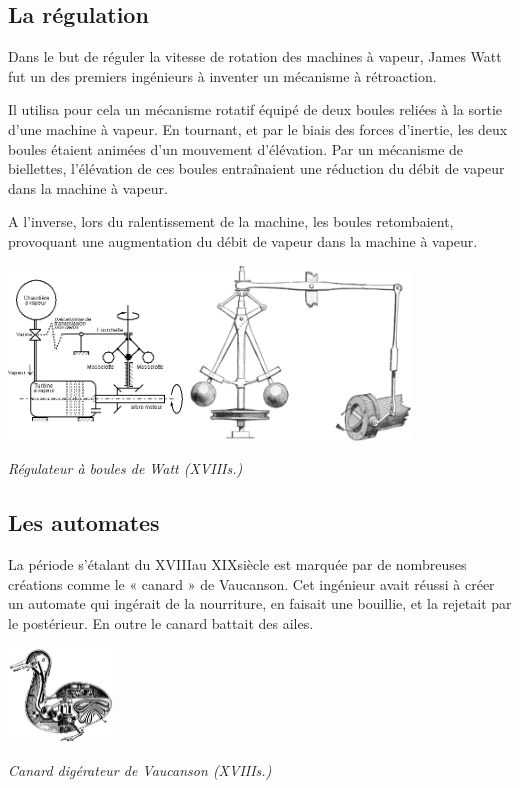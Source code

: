 \documentclass[11pt,oneside]{article}
\begin{document}
\subsection{La régulation}

Dans le but de réguler la vitesse de rotation des machines à vapeur, James Watt
fut un des premiers ingénieurs à inventer un mécanisme à rétroaction. 

Il utilisa pour cela un mécanisme rotatif équipé de deux boules reliées à la
sortie d'une machine à vapeur. En tournant, et par le biais des forces
d'inertie, les deux boules étaient animées d'un mouvement d'élévation. Par un
mécanisme de biellettes, l'élévation de ces boules entraînaient une réduction
du débit de vapeur dans la machine à vapeur. 

A l'inverse, lors du ralentissement de la machine, les boules retombaient,
provoquant une augmentation du débit de vapeur dans la machine à vapeur.

\begin{center}
 \includegraphics[width=0.8\textwidth]{png/watt}

\textit{Régulateur à boules de Watt (XVIII\ieme s.)}
 \end{center}


\subsection{Les automates}
\begin{minipage}[c]{0.7\textwidth}
La période s'étalant du XVIII\ieme au XIX\ieme siècle est marquée par de
nombreuses créations comme le « canard » de Vaucanson.
Cet ingénieur avait réussi à créer un automate qui ingérait de la nourriture, en
faisait une bouillie, et la rejetait par le postérieur. En outre le canard battait des ailes. 

\end{minipage}\hfill
\begin{minipage}[c]{0.2\textwidth}
 \begin{center}
 \includegraphics[height=2.5cm]{png/vaucanson}

\textit{Canard digérateur de Vaucanson (XVIII\ieme s.)}
 \end{center}
\end{minipage}
\end{document}
